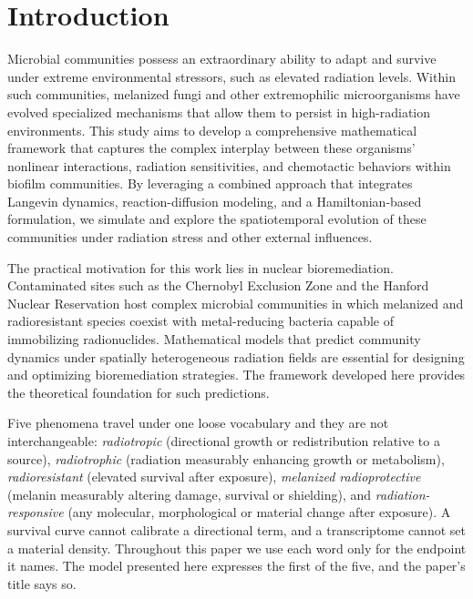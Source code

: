 \documentclass[11pt]{article}
\begin{document}
\section{Introduction}

Microbial communities possess an extraordinary ability to adapt and survive under extreme
environmental stressors, such as elevated radiation levels. Within such communities, melanized
fungi and other extremophilic microorganisms have evolved specialized mechanisms that allow them
to persist in high-radiation environments. This study aims to develop a comprehensive mathematical
framework that captures the complex interplay between these organisms' nonlinear interactions,
radiation sensitivities, and chemotactic behaviors within biofilm communities. By leveraging a
combined approach that integrates Langevin dynamics, reaction-diffusion modeling, and a
Hamiltonian-based formulation, we simulate and explore the spatiotemporal evolution of these
communities under radiation stress and other external influences.

The practical motivation for this work lies in nuclear bioremediation. Contaminated sites such
as the Chernobyl Exclusion Zone and the Hanford Nuclear Reservation host complex microbial
communities in which melanized and radioresistant species coexist with metal-reducing bacteria
capable of immobilizing radionuclides. Mathematical models that predict community dynamics under
spatially heterogeneous radiation fields are essential for designing and optimizing bioremediation
strategies. The framework developed here provides the theoretical foundation for such predictions.

Five phenomena travel under one loose vocabulary and they are not interchangeable: \emph{radiotropic}
(directional growth or redistribution relative to a source), \emph{radiotrophic} (radiation
measurably enhancing growth or metabolism), \emph{radioresistant} (elevated survival after
exposure), \emph{melanized radioprotective} (melanin measurably altering damage, survival or
shielding), and \emph{radiation-responsive} (any molecular, morphological or material change after
exposure). A survival curve cannot calibrate a directional term, and a transcriptome cannot set a
material density. Throughout this paper we use each word only for the endpoint it names. The model
presented here expresses the first of the five, and the paper's title says so.

\end{document}
